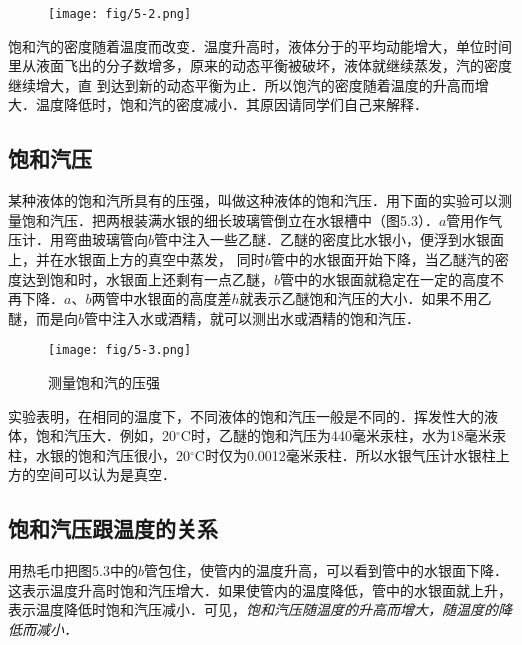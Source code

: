 \begin{figure}[htp]
\centering
\texttt{[image: fig/5-2.png]}
\caption{}
\end{figure}

饱和汽的密度随着温度而改变．温度升高时，液体分于的平均动能增大，单位时间里从液面飞出的分子数增多，原来的动态平衡被破坏，液体就继续蒸发，汽的密度继续增大，直
到达到新的动态平衡为止．所以饱汽的密度随着温度的升高而增大．温度降低时，饱和汽的密度减小．其原因请同学们自己来解释．

\subsection{饱和汽压} 

某种液体的饱和汽所具有的压强，叫做这种液体的饱和汽压．用下面的实验可以测量饱和汽压．把两根装满水银的细长玻璃管倒立在水银槽中（图5.3）．$a$管用作气压计．用弯曲玻璃管向$b$管中注入一些乙醚．乙醚的密度比水银小，便浮到水银面上，并在水银面上方的真空中蒸发，
同时$b$管中的水银面开始下降，当乙醚汽的密度达到饱和时，水银面上还剩有一点乙醚，$b$管中的水银面就稳定在一定的高度不再下降．$a$、$b$两管中水银面的高度差$h$就表示乙醚饱和汽压的大小．如果不用乙醚，而是向$b$管中注入水或酒精，就可以测出水或酒精的饱和汽压．
\begin{figure}[htp]
\centering
\texttt{[image: fig/5-3.png]}
\caption{测量饱和汽的压强
}
\end{figure}

实验表明，在相同的温度下，不同液体的饱和汽压一般是不同的．挥发性大的液体，饱和汽压大．例如，20$^\circ$C时，乙醚的饱和汽压为440毫米汞柱，水为18毫米汞柱，水银的饱和汽压很小，20$^\circ$C时仅为0.0012毫米汞柱．所以水银气压计水银柱上方的空间可以认为是真空．

\subsection{饱和汽压跟温度的关系} 

用热毛巾把图5.3中的$b$管包住，使管内的温度升高，可以看到管中的水银面下降．这表示温度升高时饱和汽压增大．如果使管内的温度降低，管中的水银面就上升，表示温度降低时饱和汽压减小．可见，\textit{饱和汽压随温度的升高而增大，随温度的降低而减小．}

